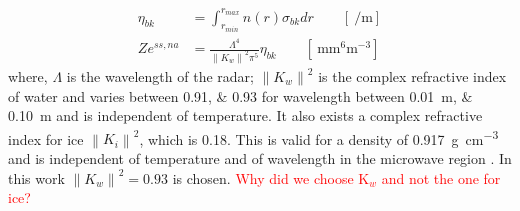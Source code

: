 \begin{align}
	\eta_{bk} & = \int_{r_{min}}^{r_{max}} n(r) \sigma_{bk} dr \qquad [\SI{}{\per\metre}] \nonumber \\
	Ze^{ss,na} & = \frac{\Lambda^4}{\left\| K_w \right\|^2 \pi^5} \eta_{bk} \qquad [\SI{}{\mm^6\metre^{-3}}] \label{eq:singleZ}
\end{align}
where, $\Lambda$ is the wavelength of the radar; $\left\| K_w \right\|^2$ is the complex refractive index of water and varies between \numlist{0.91;0.93} for wavelength between \SIlist{0.01;0.10}{\metre} and is independent of temperature. It also exists a  complex refractive index for ice $\left\| K_i \right\|^2$, which is \SI{0.18}{}. This is valid for a density of \SI{0.917}{\gram\per\cubic\cm} and is independent of temperature and of wavelength in the microwave region \citep{doviak_doppler_1993}. In this work  $\left\| K_w \right\|^2 = 0.93$ is chosen. \textcolor{red}{Why did we choose K$_w$ and not the one for ice?}

